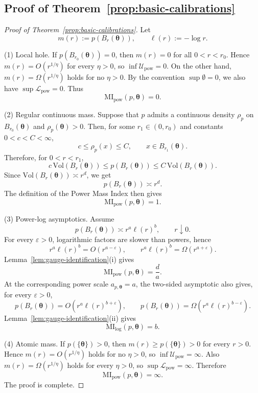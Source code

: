 \documentclass[11pt,a4paper]{article}
\newcommand{\MI}{\mathrm{MI}}
\newcommand{\pa}{\boldsymbol\theta}
\theoremstyle{compactplain}
\theoremstyle{compactdefinition}
\numberwithin{equation}{section}
\begin{document}
\subsection*{Proof of Theorem~\ref{prop:basic-calibrations}}
\begin{proof}[Proof of Theorem~\ref{prop:basic-calibrations}]
Let
\[
 m(r):=p(B_r(\pa)),
 \qquad
 \ell(r):=-\log r .
\]

\textnormal{(1) Local hole.}
If \(p(B_{r_0}(\pa))=0\), then \(m(r)=0\) for all \(0<r<r_0\). Hence
\(m(r)=O(r^{1/\eta})\) for every \(\eta>0\), so
\(\inf\mathcal U_{\mathrm{pow}}=0\). On the other hand,
\(m(r)=\Omega(r^{1/\eta})\) holds for no \(\eta>0\). By the convention
\(\sup\emptyset=0\), we also have \(\sup\mathcal L_{\mathrm{pow}}=0\). Thus
\[
 \MI_{\mathrm{pow}}(p,\pa)=0 .
\]

\textnormal{(2) Regular continuous mass.}
Suppose that \(p\) admits a continuous density \(\rho_p\) on \(B_{r_0}(\pa)\)
and \(\rho_p(\pa)>0\). Then, for some \(r_1\in(0,r_0)\) and constants
\(0<c<C<\infty\),
\[
 c\le \rho_p(x)\le C,
 \qquad x\in B_{r_1}(\pa).
\]
Therefore, for \(0<r<r_1\),
\[
 c\,\mathrm{Vol}(B_r(\pa))
 \le
 p(B_r(\pa))
 \le
 C\,\mathrm{Vol}(B_r(\pa)).
\]
Since \(\mathrm{Vol}(B_r(\pa))\asymp r^d\), we get
\[
 p(B_r(\pa))\asymp r^d .
\]
The definition of the Power Mass Index then gives
\[
 \MI_{\mathrm{pow}}(p,\pa)=1 .
\]

\textnormal{(3) Power-log asymptotics.}
Assume
\[
 p(B_r(\pa))\asymp r^a \ell(r)^b,
 \qquad r\downarrow0 .
\]
For every \(\varepsilon>0\), logarithmic factors are slower than powers, hence
\[
 r^a\ell(r)^b=O(r^{a-\varepsilon}),
 \qquad
 r^a\ell(r)^b=\Omega(r^{a+\varepsilon}).
\]
Lemma~\ref{lem:gauge-identification}\textnormal{(i)} gives
\[
 \MI_{\mathrm{pow}}(p,\pa)=\frac da .
\]
At the corresponding power scale \(a_{p,\pa}=a\), the two-sided asymptotic
also gives, for every \(\varepsilon>0\),
\[
 p(B_r(\pa))=O\!\left(r^a\ell(r)^{b+\varepsilon}\right),
 \qquad
 p(B_r(\pa))=\Omega\!\left(r^a\ell(r)^{b-\varepsilon}\right).
\]
Lemma~\ref{lem:gauge-identification}\textnormal{(ii)} gives
\[
 \MI_{\mathrm{log}}(p,\pa)=b .
\]

\textnormal{(4) Atomic mass.}
If \(p(\{\pa\})>0\), then \(m(r)\ge p(\{\pa\})>0\) for every \(r>0\). Hence
\(m(r)=O(r^{1/\eta})\) holds for no \(\eta>0\), so
\(\inf\mathcal U_{\mathrm{pow}}=\infty\). Also
\(m(r)=\Omega(r^{1/\eta})\) holds for every \(\eta>0\), so
\(\sup\mathcal L_{\mathrm{pow}}=\infty\). Therefore
\[
 \MI_{\mathrm{pow}}(p,\pa)=\infty .
\]
The proof is complete.
\end{proof}
\end{document}
